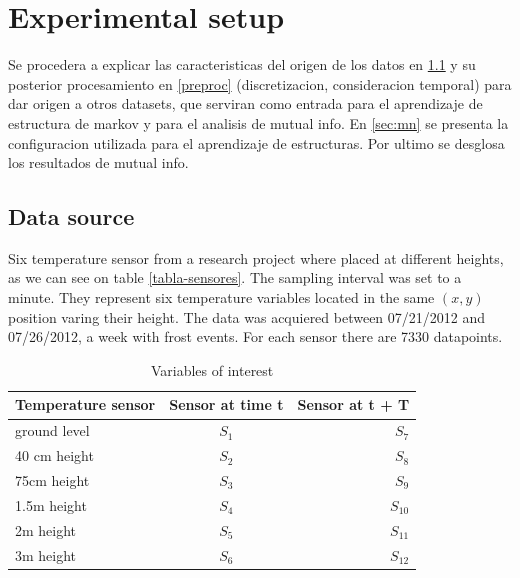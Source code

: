 \documentclass[final,a4paper]{llncs}
\begin{document}
\section{Experimental setup}

Se procedera a explicar las caracteristicas del origen de los datos en \ref{dataset-agrarias} y
su posterior procesamiento en \ref{preproc} (discretizacion, consideracion temporal) para dar 
origen a otros datasets, que serviran como entrada para el aprendizaje de estructura de markov 
y para el analisis de mutual info. En \ref{sec:mn} se presenta la configuracion utilizada para 
el aprendizaje de estructuras. Por ultimo se desglosa los resultados de mutual info.

\subsection{Data source}\label{dataset-agrarias}

Six temperature sensor\cite{logtag-datalogger} from a research project \cite{pid-fca-uncu-dataset}
where placed at different heights, as we can see on table  \ref{tabla-sensores}.
The sampling interval was set to a minute.
They represent six temperature variables located in the same
$(x,y)$ position varing their height. 
The data was acquiered between 07/21/2012 and 07/26/2012,
a week with frost events.
For each sensor there are 7330 datapoints.


\begin{table}[h]
\begin{center}
\begin{tabular}{ l | c | r }
  Temperature sensor & Sensor at time t & Sensor at t + T \\ \hline
  ground level & $S_1$  & $S_7$ \\
  40 cm height & $S_2$   & $S_8$  \\  %
  75cm height & $S_3$   & $S_9$ \\   %
  1.5m height & $S_4$   & $S_{10}$ \\  %
  2m height & $S_5$     & $S_{11}$ \\  %
  3m height & $S_6$    & $S_{12}$ \\   %
\end{tabular}
\caption{Variables of interest}
\end{center}
\end{table}\label{tabla-sensores}
\end{document}
